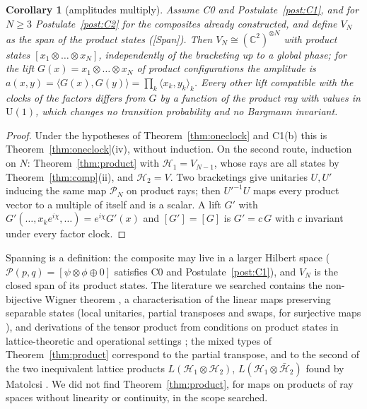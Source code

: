 \documentclass[aps,pra,onecolumn,superscriptaddress,nofootinbib,10pt]{revtex4-2}
\newtheorem{corollary}[theorem]{Corollary}
\theoremstyle{definition}
\theoremstyle{remark}
\newcommand{\C}{\mathbb{C}}
\newcommand{\ip}[2]{\langle #1,#2\rangle}
\newcommand{\U}{\mathrm{U}}
\begin{document}
\begin{corollary}[amplitudes multiply]\label{cor:ampmult}
Assume C0 and Postulate~\ref{post:C1}, and for $N\ge3$ Postulate~\ref{post:C2} for the
composites already constructed, and define $V_N$ as the span of the product states ([Span]).  Then
$V_N\cong(\C^2)^{\otimes N}$ with product states $[x_1\otimes\dots\otimes x_N]$, independently of the
bracketing up to a global phase; for the lift $G(x)=x_1\otimes\dots\otimes x_N$ of product configurations
the amplitude is $a(x,y)=\ip{G(x)}{G(y)}=\prod_k\ip{x_k}{y_k}_k$.  Every other lift compatible with the clocks
of the factors differs from $G$ by a function of the product ray with values in $\U(1)$, which changes no
transition probability and no Bargmann invariant.
\end{corollary}
\begin{proof}
Under the hypotheses of Theorem~\ref{thm:oneclock} and C1(b) this is Theorem~\ref{thm:oneclock}(iv),
without induction.  On the second route, induction on $N$: Theorem~\ref{thm:product} with $\mathcal H_1=V_{N-1}$, whose rays are all states by
Theorem~\ref{thm:comp}(ii), and $\mathcal H_2=V$.  Two bracketings give unitaries $U,U'$ inducing the same
map $\mathcal P_N$ on product rays; then $U'^{-1}U$ maps every product vector to a multiple of itself and is a
scalar.  A lift $G'$ with $G'(\dots,x_ke^{i\chi},\dots)=e^{i\chi}G'(x)$ and $[G']=[G]$ is $G'=c\,G$ with $c$
invariant under every factor clock.
\end{proof}
Spanning is a definition: the composite may live in a larger Hilbert space ($\mathcal P(p,q)=[\psi\otimes\phi\oplus0]$
satisfies C0 and Postulate~\ref{post:C1}), and $V_N$ is the closed span of its product states.
The literature we searched contains the non-bijective Wigner theorem \cite{Geher}, a characterisation
of the linear maps preserving separable states (local unitaries, partial transposes and swaps, for
surjective maps \cite{FLPS}), and derivations of the tensor product from conditions on product states
in lattice-theoretic and operational settings \cite{AertsDaubechies,Matolcsi75,CMA21}; the mixed types of
Theorem~\ref{thm:product} correspond to the partial transpose, and to the second of the two
inequivalent lattice products $L(\mathcal H_1\otimes\mathcal H_2)$, $L(\mathcal H_1\otimes\bar{\mathcal H}_2)$ found by
Matolcsi \cite{Matolcsi75}.  We did not find
Theorem~\ref{thm:product}, for maps on products of ray spaces without linearity or continuity, in the
scope searched.
\end{document}
